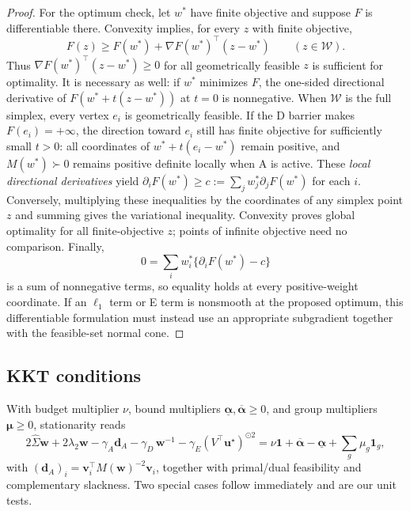\documentclass[11pt]{article}
\newcommand{\Sighat}{\hat\Sigma}
\newcommand{\one}{\mathbf{1}}
\newcommand{\w}{\mathbf{w}}
\newcommand{\vv}{\mathbf{v}}
\newcommand{\uu}{\mathbf{u}}
\newcommand{\M}{M(\w)}
\begin{document}
\begin{proof}
For the optimum check, let $w^*$ have finite objective and suppose $F$ is differentiable there. Convexity implies, for every $z$ with finite objective,
\begin{equation*}
F(z)\geq F(w^*)+\nabla F(w^*)^\top(z-w^*)\qquad(z\in\mathcal W).
\end{equation*}
Thus $\nabla F(w^*)^\top(z-w^*)\geq0$ for all geometrically feasible $z$ is sufficient for optimality. It is necessary as well: if $w^*$ minimizes $F$, the one-sided directional derivative of $F(w^*+t(z-w^*))$ at $t=0$ is nonnegative. When $\mathcal W$ is the full simplex, every vertex $e_i$ is geometrically feasible. If the D barrier makes $F(e_i)=+\infty$, the direction toward $e_i$ still has finite objective for sufficiently small $t>0$: all coordinates of $w^*+t(e_i-w^*)$ remain positive, and $M(w^*)\succ0$ remains positive definite locally when A is active. These \emph{local directional derivatives} yield $\partial_iF(w^*)\geq c:=\sum_jw_j^*\partial_jF(w^*)$ for each $i$. Conversely, multiplying these inequalities by the coordinates of any simplex point $z$ and summing gives the variational inequality. Convexity proves global optimality for all finite-objective $z$; points of infinite objective need no comparison. Finally,
\begin{equation*}
0=\sum_iw_i^*\{\partial_iF(w^*)-c\}
\end{equation*}
is a sum of nonnegative terms, so equality holds at every positive-weight coordinate. If an $\ell_1$ term or E term is nonsmooth at the proposed optimum, this differentiable formulation must instead use an appropriate subgradient together with the feasible-set normal cone.
\end{proof}




\subsection{KKT conditions}
With budget multiplier $\nu$, bound multipliers
$\underline{\boldsymbol\alpha},\overline{\boldsymbol\alpha}\ge0$, and group
multipliers $\boldsymbol\mu\ge0$, stationarity reads
\[
  2\Sighat\w+2\lambda_2\w-\gamma_A\mathbf d_A-\gamma_D\,\w^{-1}
  -\gamma_E(V^\top\uu^\star)^{\odot2}
  =\nu\one+\overline{\boldsymbol\alpha}-\underline{\boldsymbol\alpha}
   +\textstyle\sum_g\mu_g\one_g ,
\]
with $(\mathbf d_A)_i=\vv_i^\top\M^{-2}\vv_i$, together with primal/dual
feasibility and complementary slackness. Two special cases follow immediately and
are our unit tests.
\end{document}
